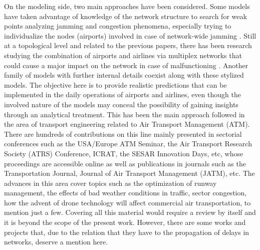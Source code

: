 On the modeling side, two main approaches have been considered. Some models have taken advantage of knowledge of the network structure to search for weak points analyzing jamming and congestion phenomena, especially trying to individualize the nodes (airports) involved in case of network-wide jamming \cite{lacasa_2009_jamming,wuellner_2010_resilience,ezaki_2014_potential,lordan_2014_study}. 
%
Still at a topological level and related to the previous papers, there has been research studying the combination of airports and airlines via multiplex networks that could cause a major impact on the network in case of malfunctioning \cite{cardillo_2013_modeling}. 
%
Another family of models with further internal details coexist along with these stylized models. The objective here is to provide realistic predictions that can be implemented in the daily operations of airports and airlines, even though the involved nature of the models may conceal the possibility of gaining insights through an analytical treatment. This has been the main approach followed in the area of transport engineering related to Air Transport Management (ATM). There are hundreds of contributions on this line mainly presented in sectorial conferences such as the USA/Europe ATM Seminar, the Air Transport Research Society (ATRS) Conference, ICRAT, the SESAR Innovation Days, etc, whose proceedings are accessible online as well as publications in journals such as the Transportation Journal, Journal of Air Transport Management (JATM), etc. 
%
The advances in this area cover topics such as the optimization of runway management, the effects of bad weather conditions in traffic, sector congestion, how the advent of drone technology will affect commercial air transportation, to mention just a few. Covering all this material would require a review by itself and it is beyond the scope of the present work. However, there are some works and projects that, due to the relation that they have to the propagation of delays in networks, deserve a mention here. 

